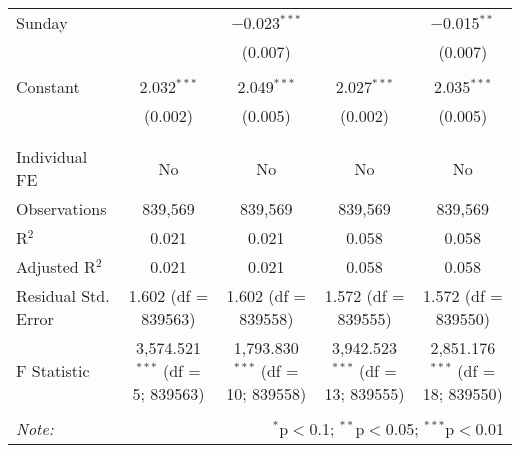 \documentclass[
]{article}
\begin{document}
\begin{table}[!htbp]
{\begin{tabular}{@{\extracolsep{5pt}}lcccc}
 Sunday &  & $-$0.023$^{***}$ &  & $-$0.015$^{**}$ \\ 
  &  & (0.007) &  & (0.007) \\ 
  & & & & \\ 
 Constant & 2.032$^{***}$ & 2.049$^{***}$ & 2.027$^{***}$ & 2.035$^{***}$ \\ 
  & (0.002) & (0.005) & (0.002) & (0.005) \\ 
  & & & & \\ 
\hline \\[-1.8ex] 
Individual FE & No & No & No & No \\ 
Observations & 839,569 & 839,569 & 839,569 & 839,569 \\ 
R$^{2}$ & 0.021 & 0.021 & 0.058 & 0.058 \\ 
Adjusted R$^{2}$ & 0.021 & 0.021 & 0.058 & 0.058 \\ 
Residual Std. Error & 1.602 (df = 839563) & 1.602 (df = 839558) & 1.572 (df = 839555) & 1.572 (df = 839550) \\ 
F Statistic & 3,574.521$^{***}$ (df = 5; 839563) & 1,793.830$^{***}$ (df = 10; 839558) & 3,942.523$^{***}$ (df = 13; 839555) & 2,851.176$^{***}$ (df = 18; 839550) \\ 
\hline 
\hline \\[-1.8ex] 
\textit{Note:}  & \multicolumn{4}{r}{$^{*}$p$<$0.1; $^{**}$p$<$0.05; $^{***}$p$<$0.01} \\ 
\end{tabular}
} 
\end{table} 
\newpage
\end{document}
